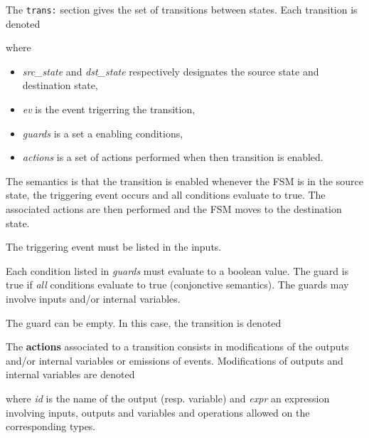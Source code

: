 The \verb|trans:| section gives the set of transitions between states. Each transition is denoted

\begin{center}
\end{center}

where
\begin{itemize}
\item \emph{src\_state} and \emph{dst\_state} respectively designates the source state and destination state,
\item \emph{ev} is the event trigerring the transition,
\item \emph{guards} is a set a enabling conditions,
\item \emph{actions} is a set of actions performed when then transition is enabled.
\end{itemize}

\medskip The semantics is that the transition is enabled whenever the FSM is in the source state,
the triggering event occurs and all conditions evaluate to true. The associated actions are then
performed and the FSM moves to the destination state.

\medskip
The triggering event must be listed in the inputs.

\medskip
Each condition listed in \emph{guards} must evaluate to a boolean value. The guard is true if
\emph{all} conditions evaluate to true (conjonctive semantics).
The guards may involve inputs and/or internal variables.

\medskip
The guard can be empty. In this case, the transition is denoted
\begin{center}
\end{center}

\medskip The \textbf{actions} associated to a transition consists in modifications of the outputs
and/or internal variables or emissions of events. Modifications of outputs and internal variables
are denoted

\begin{center}
\end{center}

where \emph{id} is the name of the output (resp. variable) and \emph{expr} an expression involving
inputs, outputs and variables and operations allowed on the corresponding types.

